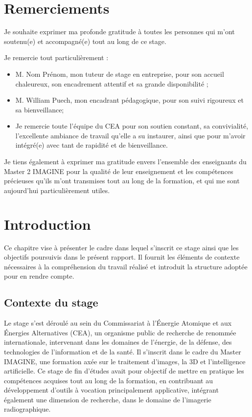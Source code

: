 \documentclass[12pt,a4paper]{report}
\begin{document}
\chapter*{Remerciements}

Je souhaite exprimer ma profonde gratitude à toutes les personnes qui m'ont soutenu(e) et accompagné(e) tout au long de ce stage.

Je remercie tout particulièrement :
\begin{itemize}
  \item M. Nom Prénom, mon tuteur de stage en entreprise, pour son accueil chaleureux, son encadrement attentif et sa grande disponibilité ;
  \item M. William Puech, mon encadrant pédagogique, pour son suivi rigoureux et sa bienveillance;
  \item Je remercie toute l’équipe du CEA pour son soutien constant, sa convivialité, l’excellente ambiance de travail qu’elle a su instaurer, ainsi que pour m’avoir intégré(e) avec tant de rapidité et de bienveillance.
\end{itemize}

Je tiens également à exprimer ma gratitude envers l’ensemble des enseignants du Master 2 IMAGINE pour la qualité de leur enseignement et les compétences précieuses qu’ils m’ont transmises tout au long de la formation, et qui me sont aujourd’hui particulièrement utiles.

\tableofcontents
\pagestyle{fancy}
\newpage

\chapter{Introduction}

Ce chapitre vise à présenter le cadre dans lequel s’inscrit ce stage ainsi que les objectifs poursuivis dans le présent rapport. Il fournit les éléments de contexte nécessaires à la compréhension du travail réalisé et introduit la structure adoptée pour en rendre compte.

\section{Contexte du stage}
Le stage s’est déroulé au sein du Commissariat à l'Énergie Atomique et aux Énergies Alternatives (CEA), un organisme public de recherche de renommée internationale, intervenant dans les domaines de l’énergie, de la défense, des technologies de l’information et de la santé. Il s’inscrit dans le cadre du Master IMAGINE, une formation axée sur le traitement d’images, la 3D et l’intelligence artificielle. Ce stage de fin d’études avait pour objectif de mettre en pratique les compétences acquises tout au long de la formation, en contribuant au développement d’outils à vocation principalement applicative, intégrant également une dimension de recherche, dans le domaine de l’imagerie radiographique.
\end{document}
